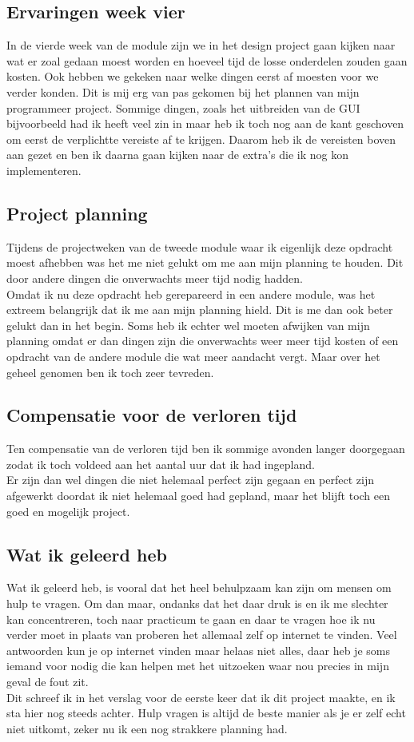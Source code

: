 \documentclass[12pt]{article}
\begin{document}
\subsection{Ervaringen week vier}
In de vierde week van de module zijn we in het design project gaan kijken naar wat er zoal gedaan moest worden en hoeveel tijd de losse onderdelen zouden gaan kosten. Ook hebben we gekeken naar welke dingen eerst af moesten voor we verder konden. Dit is mij erg van pas gekomen bij het plannen van mijn programmeer project. Sommige dingen, zoals het uitbreiden van de GUI bijvoorbeeld had ik heeft veel zin in maar heb ik toch nog aan de kant geschoven om eerst de verplichtte vereiste af te krijgen. Daarom heb ik de vereisten boven aan gezet en ben ik daarna gaan kijken naar de extra's die ik nog kon implementeren.\\
\subsection{Project planning}
Tijdens de projectweken van de tweede module waar ik eigenlijk deze opdracht moest afhebben was het me niet gelukt om me aan mijn planning te houden. Dit door andere dingen die onverwachts meer tijd nodig hadden.\\
Omdat ik nu deze opdracht heb gerepareerd in een andere module, was het extreem belangrijk dat ik me aan mijn planning hield. Dit is me dan ook beter gelukt dan in het begin.  Soms heb ik echter wel moeten afwijken van mijn planning omdat er dan dingen zijn die onverwachts weer meer tijd kosten of een opdracht van de andere module die wat meer aandacht vergt. Maar over het geheel genomen ben ik toch zeer tevreden.
\subsection{Compensatie voor de verloren tijd}
Ten compensatie van de verloren tijd ben ik sommige avonden langer doorgegaan zodat ik toch voldeed aan het aantal uur dat ik had ingepland.\\
Er zijn dan wel dingen die niet helemaal perfect zijn gegaan en perfect zijn afgewerkt doordat ik niet helemaal goed had gepland, maar het blijft toch een goed en mogelijk project.
\subsection{Wat ik geleerd heb}
Wat ik geleerd heb, is vooral dat het heel behulpzaam kan zijn om mensen om hulp te vragen. Om dan maar, ondanks dat het daar druk is en ik me slechter kan concentreren, toch naar practicum te gaan en daar te vragen hoe ik nu verder moet in plaats van proberen het allemaal zelf op internet te vinden. Veel antwoorden kun je op internet vinden maar helaas niet alles, daar heb je soms iemand voor nodig die kan helpen met het uitzoeken waar nou precies in mijn geval de fout zit.\\
Dit schreef ik in het verslag voor de eerste keer dat ik dit project maakte, en ik sta hier nog steeds achter. Hulp vragen is altijd de beste manier als je er zelf echt niet uitkomt, zeker nu ik een nog strakkere planning had.
\end{document}
